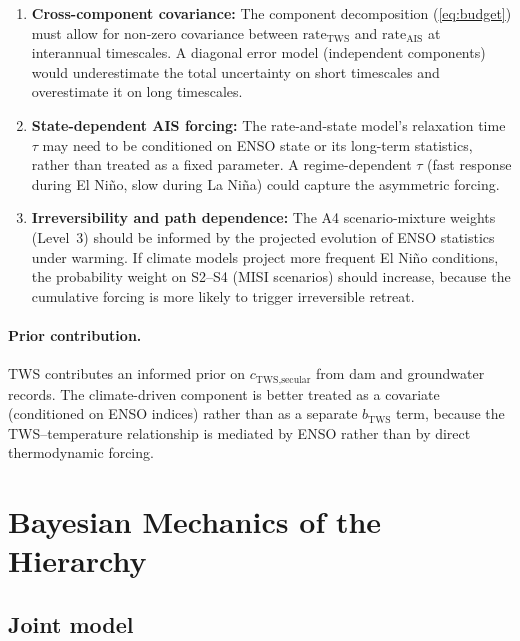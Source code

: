 \documentclass[11pt]{article}
\newcommand{\CDW}{\text{CDW}}
\begin{document}
\begin{enumerate}
  \item \textbf{Cross-component covariance:} The component decomposition (\cref{eq:budget}) must allow for non-zero covariance between $\text{rate}_{\text{TWS}}$ and $\text{rate}_{\text{AIS}}$ at interannual timescales.  A diagonal error model (independent components) would underestimate the total uncertainty on short timescales and overestimate it on long timescales.

  \item \textbf{State-dependent AIS forcing:} The rate-and-state model's relaxation time $\tau$ may need to be conditioned on ENSO state or its long-term statistics, rather than treated as a fixed parameter.  A regime-dependent $\tau$ (fast response during El Ni\~no, slow during La Ni\~na) could capture the asymmetric forcing.

  \item \textbf{Irreversibility and path dependence:} The A4 scenario-mixture weights (Level~3) should be informed by the projected evolution of ENSO statistics under warming.  If climate models project more frequent El Ni\~no conditions, the probability weight on S2--S4 (MISI scenarios) should increase, because the cumulative \CDW{} forcing is more likely to trigger irreversible retreat.
\end{enumerate}

\paragraph{Prior contribution.}  TWS contributes an informed prior on $c_{\text{TWS,secular}}$ from dam and groundwater records.  The climate-driven component is better treated as a covariate (conditioned on ENSO indices) rather than as a separate $b_{\text{TWS}}$ term, because the TWS--temperature relationship is mediated by ENSO rather than by direct thermodynamic forcing.


\section{Bayesian Mechanics of the Hierarchy}
\label{sec:mechanics}

\subsection{Joint model}
\end{document}
